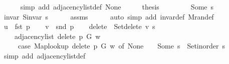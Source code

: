 \begin{isabellebody}
\ \ \ \ \isamarkupfalse%
\ {\isacharparenleft}{\kern0pt}simp\ add{\isacharcolon}{\kern0pt}\ adjacency{\isacharunderscore}{\kern0pt}list{\isacharunderscore}{\kern0pt}def\ None{\isacharparenright}{\kern0pt}\isanewline
\ \ \isamarkupfalse%
\ \isamarkupfalse%
\ {\isacharquery}{\kern0pt}thesis\isanewline
\ \ \ \ \isacommand{{\isachardot}{\kern0pt}}\isamarkupfalse%
\isanewline
{}\isamarkupfalse%
\isanewline
\ \ \isamarkupfalse%
\ {\isacharparenleft}{\kern0pt}Some\ s{\isacharparenright}{\kern0pt}\isanewline
\ \ \isamarkupfalse%
\ invar{\isacharcolon}{\kern0pt}\ {\isachardoublequoteopen}S{\isachardot}{\kern0pt}invar\ s{\isachardoublequoteclose}\isanewline
\ \ \ \ \isamarkupfalse%
\ assms{\isacharparenleft}{\kern0pt}{}{\isacharparenright}{\kern0pt}\isanewline
\ \ \ \ \isamarkupfalse%
\ {\isacharparenleft}{\kern0pt}auto\ simp\ add{\isacharcolon}{\kern0pt}\ invar{\isacharunderscore}{\kern0pt}def\ M{\isachardot}{\kern0pt}ran{\isacharunderscore}{\kern0pt}def{\isacharparenright}{\kern0pt}\isanewline
\ \ \isamarkupfalse%
\ {\isacharquery}{\kern0pt}u\ {\isacharequal}{\kern0pt}\ {\isachardoublequoteopen}fst\ p{\isachardoublequoteclose}\isanewline
\ \ \isamarkupfalse%
\ {\isacharquery}{\kern0pt}v\ {\isacharequal}{\kern0pt}\ {\isachardoublequoteopen}snd\ p{\isachardoublequoteclose}\isanewline
\ \ \isamarkupfalse%
\ {\isacharquery}{\kern0pt}delete\ {\isacharequal}{\kern0pt}\ {\isachardoublequoteopen}Set{\isacharunderscore}{\kern0pt}delete\ {\isacharquery}{\kern0pt}v\ s{\isachardoublequoteclose}\isanewline
\ \ \isamarkupfalse%
\isanewline
\ \ \ \ {\isachardoublequoteopen}adjacency{\isacharunderscore}{\kern0pt}list\ {\isacharparenleft}{\kern0pt}delete\ p\ G{\isacharparenright}{\kern0pt}\ w\ {\isacharequal}{\kern0pt}\isanewline
\ \ \ \ \ {\isacharparenleft}{\kern0pt}case\ Map{\isacharunderscore}{\kern0pt}lookup\ {\isacharparenleft}{\kern0pt}delete\ p\ G{\isacharparenright}{\kern0pt}\ w\ of\ None\ {\isasymRightarrow}\ {\isacharbrackleft}{\kern0pt}{\isacharbrackright}{\kern0pt}\ {\isacharbar}{\kern0pt}\ Some\ s\ {\isasymRightarrow}\ Set{\isacharunderscore}{\kern0pt}inorder\ s{\isacharparenright}{\kern0pt}{\isachardoublequoteclose}\isanewline
\ \ \ \ \isamarkupfalse%
\ {\isacharparenleft}{\kern0pt}simp\ add{\isacharcolon}{\kern0pt}\ adjacency{\isacharunderscore}{\kern0pt}list{\isacharunderscore}{\kern0pt}def{\isacharparenright}{\kern0pt}\isanewline
\ \ \isamarkupfalse%

\end{isabellebody}
